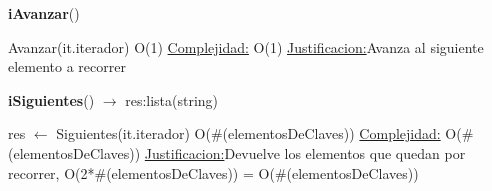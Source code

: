 \begin{Algoritmos}
\begin{algorithm}[H]{\textbf{iAvanzar}()}
	\begin{algorithmic}[1]
		\State Avanzar(it.iterador) \Comment O(1)
		\medskip
		\Statex \underline{Complejidad:} O(1)
			\Statex \underline{Justificacion:}Avanza al siguiente elemento a recorrer
	\end{algorithmic}
\end{algorithm}

\begin{algorithm}[H]{\textbf{iSiguientes}() $\to$ res:lista(string)}
	\begin{algorithmic}[1]
		\State res $\gets$ Siguientes(it.iterador) \Comment O($\#$(elementosDeClaves))
		\medskip
		\Statex \underline{Complejidad:} O($\#$(elementosDeClaves))
			\Statex \underline{Justificacion:}Devuelve los elementos que quedan por recorrer, O(2*$\#$(elementosDeClaves)) = O($\#$(elementosDeClaves))
	\end{algorithmic}
\end{algorithm}

\end{Algoritmos}
